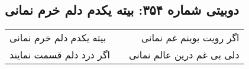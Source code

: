\begin{center}
\section*{دوبیتی شماره ۳۵۴: بیته یکدم دلم خرم نمانی}
\label{sec:354}
\begin{longtable}{l p{0.5cm} r}
بیته یکدم دلم خرم نمانی
&&
اگر رویت بوینم غم نمانی
\\
اگر درد دلم قسمت نمایند
&&
دلی بی غم درین عالم نمانی
\\
\end{longtable}
\end{center}
